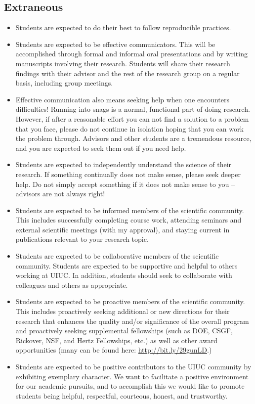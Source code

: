 \documentclass[12pt,twoside]{article}
\begin{document}
\subsection*{Extraneous}

\begin{itemize}
\item Students are expected to do their best to follow reproducible practices. 
\item Students are expected to be effective communicators. This will be accomplished through formal and informal oral presentations and by writing manuscripts involving their research. Students will share their research findings with their advisor and the rest of the research group on a regular basis, including group meetings.  
\item Effective communication also means seeking help when one encounters difficulties! Running into snags is a normal, functional part of doing research. However, if after a reasonable effort you can not find a solution to a problem that you face, please do not continue in isolation hoping that you can work the problem through. Advisors and other students are a tremendous resource, and you are expected to seek them out if you need help.
\item Students are expected to independently understand the science of their research. If something continually does not make sense, please seek deeper help. Do not simply accept something if it does not make sense to you -- advisors are not always right!
\item Students are expected to be informed members of the scientific community. This includes successfully completing course work, attending seminars and external scientific meetings (with my approval), and staying current in publications relevant to your research topic. 
\item Students are expected to be collaborative members of the scientific community. Students are expected to be supportive and helpful to others working at UIUC. In addition, students should seek to collaborate with colleagues and others as appropriate.
\item Students are expected to be proactive members of the scientific community. This includes proactively seeking additional or new directions for their research that enhances the quality and/or significance of the overall program and proactively seeking supplemental fellowships (such as DOE, CSGF, Rickover, NSF, and Hertz Fellowships, etc.) as well as other award opportunities (many can be found here: \url{http://bit.ly/29gunLD}.)
\item Students are expected to be positive contributors to the UIUC community by exhibiting exemplary character. We want to facilitate a positive environment for our academic pursuits, and to accomplish this we would like to promote students being helpful, respectful, courteous, honest, and trustworthy. 
\end{itemize}
\end{document}
